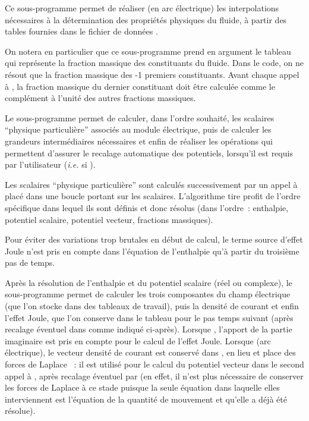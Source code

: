 
Ce sous-programme permet de réaliser (en arc électrique) les interpolations
nécessaires à la dé\-ter\-mi\-na\-tion des propriétés physiques du fluide, à
partir des tables fournies dans le fichier de données .

On notera en particulier que ce sous-programme prend en argument le tableau
 qui représente la fraction massique des 
constituants du fluide. Dans le code, on ne résout que la fraction massique
des -1 premiers constituants. Avant chaque appel à ,
la fraction massique du dernier constituant doit être calculée comme le
complément à l'unité des autres fractions massiques.


Le sous-programme  permet de calculer, dans l'ordre souhaité,
les  scalaires ``physique particulière'' associés au module
électrique, puis de calculer les grandeurs intermédiaires né\-ces\-sai\-res et
enfin de
réaliser les opérations qui permettent d'assurer le recalage automatique
des potentiels, lorsqu'il est requis par l'utilisateur ({\it i.e.} si ).

Les  scalaires ``physique particulière'' sont calculés successivement par un
appel à  placé dans une boucle portant sur les 
scalaires. L'algorithme tire profit de l'ordre spécifique dans lequel ils sont définis et donc
résolus (dans l'ordre~: enthalpie, potentiel scalaire, potentiel vecteur, fractions massiques).

Pour éviter des variations trop brutales en début de calcul, le terme source
d'effet Joule n'est pris en compte dans l'équation de l'enthalpie qu'à
partir du troisième pas de temps.

Après la résolution de l'enthalpie et du potentiel scalaire
(réel ou complexe), le sous-programme  permet de calculer
les trois composantes du champ électrique
(que l'on stocke dans des tableaux de travail), puis la densité de courant
et enfin l'effet Joule, que l'on conserve dans le tableau 
pour le pas temps suivant (après recalage éventuel dans  comme
indiqué ci-après).
Lorsque ,  l'apport de la partie imaginaire est pris en
compte pour le calcul de l'effet Joule. Lorsque 
(arc électrique), le vecteur densité de courant est
conservé dans , en lieu et place des forces de Laplace
~: il est utilisé pour le calcul du potentiel vecteur dans le
second appel à ,
après recalage éventuel par  (en effet, il n'est plus
nécessaire de conserver les forces de Laplace à ce stade puisque
la seule équation dans laquelle elles interviennent est l'équation de la
quantité de mouvement et qu'elle a déjà été résolue).

